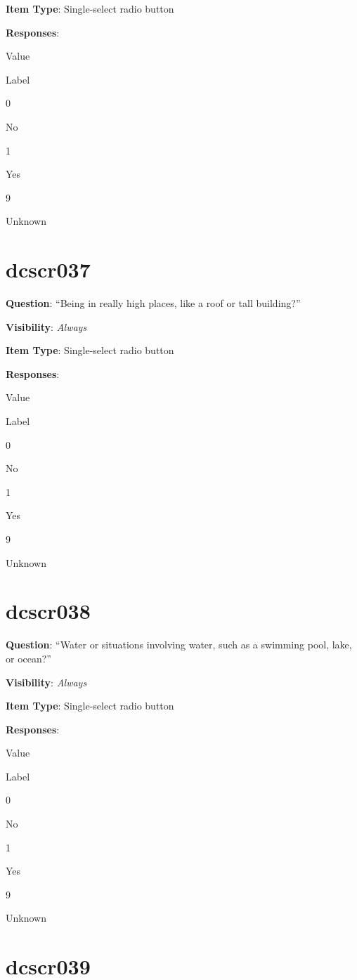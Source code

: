 \documentclass[]{book}
\begin{document}
\textbf{Item Type}: Single-select radio button

\textbf{Responses}:

Value

Label

0

No

1

Yes

9

Unknown

\hypertarget{dcscr037}{%
\section{dcscr037}\label{dcscr037}}

\textbf{Question}: ``Being in really high places, like a roof or tall building?''

\textbf{Visibility}: \emph{Always}

\textbf{Item Type}: Single-select radio button

\textbf{Responses}:

Value

Label

0

No

1

Yes

9

Unknown

\hypertarget{dcscr038}{%
\section{dcscr038}\label{dcscr038}}

\textbf{Question}: ``Water or situations involving water, such as a swimming pool, lake, or ocean?''

\textbf{Visibility}: \emph{Always}

\textbf{Item Type}: Single-select radio button

\textbf{Responses}:

Value

Label

0

No

1

Yes

9

Unknown

\hypertarget{dcscr039}{%
\section{dcscr039}\label{dcscr039}}
\end{document}
